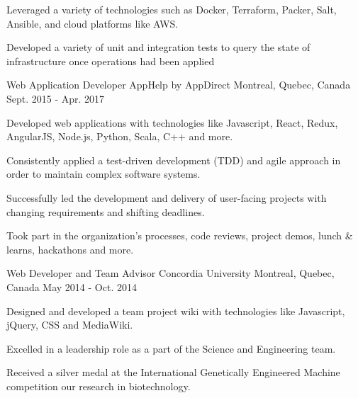 \begin{cventries}
{\begin{cvitems}
      \item \small Leveraged a variety of technologies such as Docker, Terraform, Packer, Salt, Ansible, and cloud platforms like AWS.
      \item \small Developed a variety of unit and integration tests to query the state of infrastructure once operations had been applied
      \end{cvitems}
    }
  \cventry
  {\small Web Application Developer} %
  {\normalsize AppHelp by AppDirect} %
  {\small Montreal, Quebec, Canada} %
  {\small Sept. 2015 - Apr. 2017 } %
    {
      \begin{cvitems} %
      \item \small Developed web applications with technologies like Javascript, React, Redux, AngularJS, Node.js, Python, Scala, C++ and more.
      \item \small Consistently applied a test-driven development (TDD) and agile approach in order to maintain complex software systems.
      \item \small Successfully led the development and delivery of user-facing projects with changing requirements and shifting deadlines.
      \item \small Took part in the organization's processes, code reviews, project demos, lunch \& learns, hackathons and more.
      \end{cvitems}
    }

\vspace{2mm}
  \cventry
  {\small Web Developer and Team Advisor} %
  {\normalsize Concordia University} %
    {\small Montreal, Quebec, Canada} %
    {\small May 2014 - Oct. 2014} %
    {
      \begin{cvitems} %
      \item \small Designed and developed a team project wiki with technologies like Javascript, jQuery, CSS and MediaWiki.
      \item \small Excelled in a leadership role as a part of the Science and Engineering team.
      \item \small Received a silver medal at the International Genetically Engineered Machine competition our research in biotechnology.
      \end{cvitems}
    }
\end{cventries}
